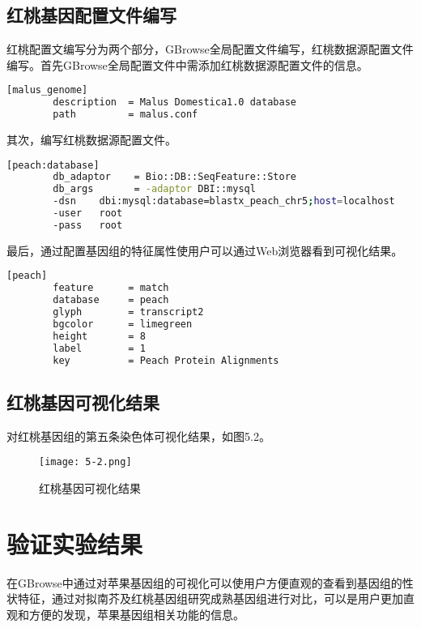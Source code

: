 		\subsection{红桃基因配置文件编写}
		红桃配置文编写分为两个部分，GBrowse全局配置文件编写，红桃数据源配置文件编写。首先GBrowse全局配置文件中需添加红桃数据源配置文件的信息。
		\begin{lstlisting}[language=bash]
		[malus_genome]
		description  = Malus Domestica1.0 database
		path         = malus.conf
		\end{lstlisting}
		其次，编写红桃数据源配置文件。
		\begin{lstlisting}[language=bash]
		[peach:database]
		db_adaptor    = Bio::DB::SeqFeature::Store
		db_args       = -adaptor DBI::mysql
		-dsn    dbi:mysql:database=blastx_peach_chr5;host=localhost
		-user   root
		-pass   root
		\end{lstlisting}
		最后，通过配置基因组的特征属性使用户可以通过Web浏览器看到可视化结果。
		\begin{lstlisting}[language=bash]
		[peach]
		feature      = match
		database     = peach
		glyph        = transcript2 
		bgcolor      = limegreen
		height       = 8
		label        = 1
		key          = Peach Protein Alignments
		\end{lstlisting}
		\subsection{红桃基因可视化结果}
		对红桃基因组的第五条染色体可视化结果，如图5.2。
		\begin{figure}[!ht]
			\centering
			\texttt{[image: 5-2.png]}
			\caption{红桃基因可视化结果}
		\end{figure}
	\section{验证实验结果}
	在GBrowse中通过对苹果基因组的可视化可以使用户方便直观的查看到基因组的性状特征，通过对拟南芥及红桃基因组研究成熟基因组进行对比，可以是用户更加直观和方便的发现，苹果基因组相关功能的信息。
	
		